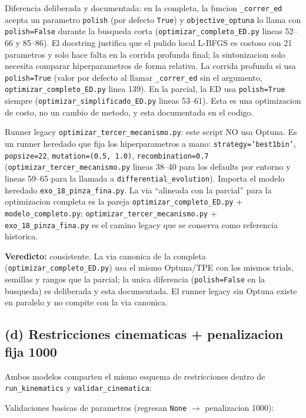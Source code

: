 \documentclass[11pt,a4paper]{article}
\newcommand{\code}[1]{\texttt{#1}}
\begin{document}
Diferencia deliberada y documentada: en la completa, la funcion \code{\_correr\_ed}
acepta un parametro \code{polish} (por defecto \code{True}) y
\code{objective\_optuna} lo llama con \code{polish=False} durante la busqueda
corta (\code{optimizar\_completo\_ED.py} lineas 52--66 y 85--86). El docstring
justifica que el pulido local L-BFGS es costoso con 21 parametros y solo hace
falta en la corrida profunda final; la sintonizacion solo necesita comparar
hiperparametros de forma relativa. La corrida profunda si usa \code{polish=True}
(valor por defecto al llamar \code{\_correr\_ed} sin el argumento,
\code{optimizar\_completo\_ED.py} linea 139). En la parcial, la ED usa
\code{polish=True} siempre (\code{optimizar\_simplificado\_ED.py} lineas 53--61).
Esta es una optimizacion de costo, no un cambio de metodo, y esta documentada en
el codigo.

Runner legacy \code{optimizar\_tercer\_mecanismo.py}: este script NO usa Optuna.
Es un runner heredado que fija los hiperparametros a mano:
\code{strategy='best1bin'}, \code{popsize=22}, \code{mutation=(0.5, 1.0)},
\code{recombination=0.7} (\code{optimizar\_tercer\_mecanismo.py} lineas 38--40
para los defaults por entorno y lineas 59--65 para la llamada a
\code{differential\_evolution}). Importa el modelo heredado
\code{exo\_18\_pinza\_fina.py}. La via ``alineada con la parcial'' para la
optimizacion completa es la pareja \code{optimizar\_completo\_ED.py} +
\code{modelo\_completo.py}; \code{optimizar\_tercer\_mecanismo.py} +
\code{exo\_18\_pinza\_fina.py} es el camino legacy que se conserva como
referencia historica.

\textbf{Veredicto:} consistente. La via canonica de la completa
(\code{optimizar\_completo\_ED.py}) usa el mismo Optuna/TPE con los mismos trials,
semillas y rangos que la parcial; la unica diferencia (\code{polish=False} en la
busqueda) es deliberada y esta documentada. El runner legacy sin Optuna existe en
paralelo y no compite con la via canonica.

\subsection{(d) Restricciones cinematicas + penalizacion fija 1000}

Ambos modelos comparten el mismo esquema de restricciones dentro de
\code{run\_kinematics} y \code{validar\_cinematica}:

Validaciones basicas de parametros (regresan \code{None} $\to$ penalizacion 1000):
\end{document}
